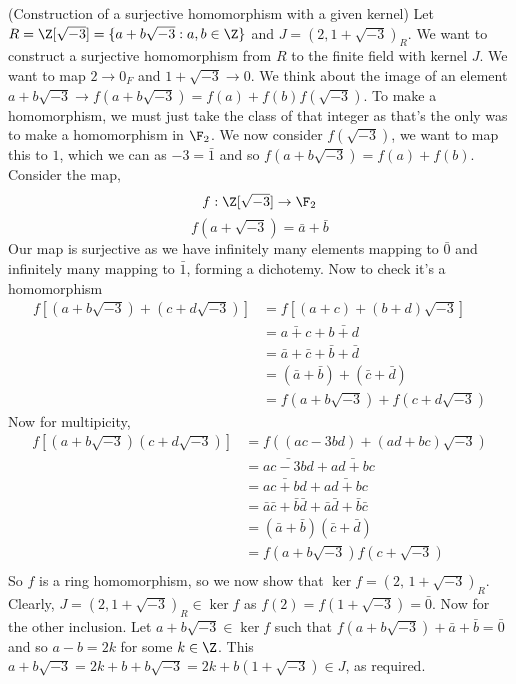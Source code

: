 \begin{eg}{(Construction of a surjective homomorphism with a given kernel)}
  Let $R = \Z[\sqrt{-3}] = \{a + b\sqrt{-3} : a, b \in \Z\}$ and $J = (2, 1 + \sqrt{-3})_R$. We want to construct a surjective homomorphism from $R$ to the finite field with kernel $J$. We want to map $2 \to 0_F$ and $1 + \sqrt{-3} \to 0$. We think about the image of an element $a + b\sqrt{-3} \to f(a + b\sqrt{-3}) = f(a) + f(b)f(\sqrt{-3})$.
  To make a homomorphism, we must just take the class of that integer as that's the only was to make a homomorphism in $\F_2$. We now consider $f(\sqrt{-3})$, we want to map this to $1$, which we can as $-3 = \bar 1$ and so $f(a + b\sqrt{-3}) = f(a) + f(b)$.
  Consider the map,
  $$f : \Z[\sqrt{-3}] \to \F_2$$
  $$ f(a + \sqrt{-3}) = \bar a + \bar b $$
  Our map is surjective as we have infinitely many elements mapping to $\bar 0$ and infinitely many mapping to $\bar 1$, forming a dichotemy. Now to check it's a homomorphism
  \begin{align*}
    f\left[ (a + b\sqrt{-3}) + (c + d\sqrt{-3}) \right] &= f\left[ (a + c) + (b + d)\sqrt{-3} \right] \\
    &= \bar{a + c} + \bar{b + d} \\
    &= \bar a + \bar c + \bar b + \bar d \\
    &= (\bar a + \bar b) + (\bar c + \bar d)\\
    &= f(a+ b\sqrt{-3}) + f(c + d\sqrt{-3})
  \end{align*}
  Now for multipicity,
  \begin{align*}
    f\left[ (a + b\sqrt{-3})(c + d\sqrt{-3}) \right] &= f((ac - 3bd) + (ad + bc)\sqrt{-3})\\
    &= \bar{ac - 3bd} + \bar{ad + bc} \\
    &= \bar{ac + bd} + \bar{ad + bc}\\
    &= \bar a\bar c + \bar b\bar d + \bar a\bar d + \bar b\bar c\\
    &= (\bar a + \bar b)(\bar c + \bar d) \\
    &= f(a + b\sqrt{-3})f(c + \sqrt{-3})\\
  \end{align*}
  So $f$ is a ring homomorphism, so we now show that $\ker f = (2,\,1+\sqrt{-3})_R$. Clearly, $J = (2, 1 + \sqrt{-3})_R \in \ker f$ as $f(2) = f(1 + \sqrt{-3}) = \bar 0$. Now for the other inclusion. Let $a + b\sqrt{-3} \in \ker f$ such that $f(a + b\sqrt{-3}) + \bar a + \bar b = \bar 0$ and so $a - b = 2k$ for some $k \in \Z$. This $a + b \sqrt{-3} = 2k + b + b\sqrt{-3} = 2k + b(1 + \sqrt{-3}) \in J$, as required.
\end{eg}
